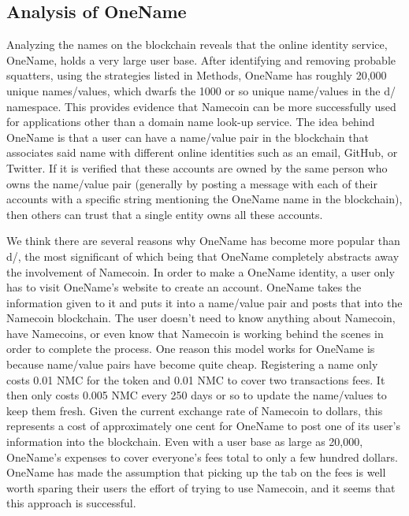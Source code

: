 \subsection{Analysis of OneName}
    Analyzing the names on the blockchain reveals that the online identity service, OneName, holds a very large user base. After identifying and removing probable squatters, using the strategies listed in Methods, OneName has roughly 20,000 unique names/values, which dwarfs the 1000 or so unique name/values in the d/ namespace. This provides evidence that Namecoin can be more successfully used for applications other than a domain name look-up service. The idea behind OneName is that a user can have a name/value pair in the blockchain that associates said name with different online identities such as an email, GitHub, or Twitter. If it is verified that these accounts are owned by the same person who owns the name/value pair (generally by posting a message with each of their accounts with a specific string mentioning the OneName name in the blockchain), then others can trust that a single entity owns all these accounts. 

We think there are several reasons why OneName has become more popular than d/, the most significant of which being that OneName completely abstracts away the involvement of Namecoin. In order to make a OneName identity, a user only has to visit OneName's website to create an account. OneName takes the information given to it and puts it into a name/value pair and posts that into the Namecoin blockchain. The user doesn't need to know anything about Namecoin, have Namecoins, or even know that Namecoin is working behind the scenes in order to complete the process. One reason this model works for OneName is because name/value pairs have become quite cheap. Registering a name only costs 0.01 NMC for the token and 0.01 NMC to cover two transactions fees. It then only costs 0.005 NMC every 250 days or so to update the name/values to keep them fresh. Given the current exchange rate of Namecoin to dollars, this represents a cost of approximately one cent for OneName to post one of its user's information into the blockchain. Even with a user base as large as 20,000, OneName's expenses to cover everyone's fees total to only a few hundred dollars. OneName has made the assumption that picking up the tab on the fees is well worth sparing their users the effort of trying to use Namecoin, and it seems that this approach is successful.


